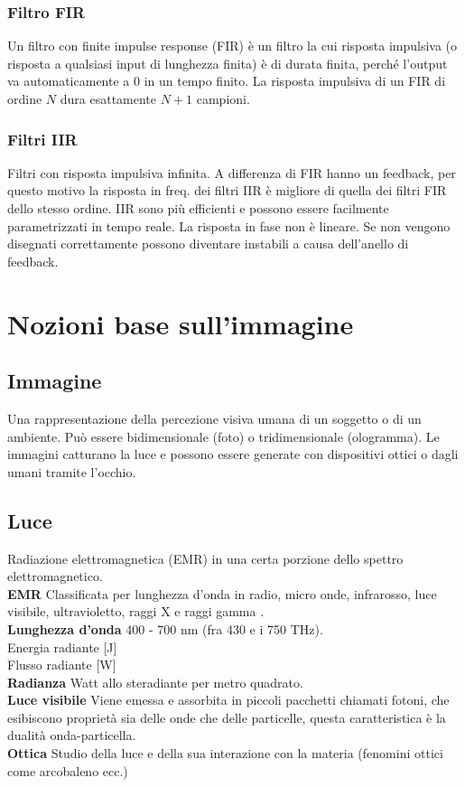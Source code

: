 \documentclass[8pt,a4paper]{article}
\begin{document}
\begin{multicols}{5}
    \subsubsection{Filtro FIR}
    Un filtro con finite impulse response (FIR) è un filtro la cui risposta
    impulsiva (o risposta a qualsiasi input di lunghezza finita) è di durata finita,
    perché l'output va automaticamente a 0 in un tempo finito.
    La risposta impulsiva di un FIR di ordine $N$ dura esattamente $N + 1$ campioni.

    \subsubsection{Filtri IIR}
    Filtri con risposta impulsiva infinita. A differenza di FIR hanno un feedback,
    per questo motivo la risposta in freq. dei filtri IIR è migliore di quella dei
    filtri FIR dello stesso ordine.
    IIR sono più efficienti e possono essere facilmente parametrizzati in tempo reale.
    La risposta in fase non è lineare. Se non vengono disegnati correttamente possono
    diventare instabili a causa dell'anello di feedback.

    \section{Nozioni base sull'immagine}
    \subsection{Immagine}
    Una rappresentazione della percezione visiva umana di un soggetto o di un ambiente.
    Può essere bidimensionale (foto) o tridimensionale (ologramma). Le immagini 
    catturano la luce e possono essere generate con dispositivi ottici o dagli umani 
    tramite l’occhio.

    \subsection{Luce}
    Radiazione elettromagnetica (EMR) in una certa porzione dello spettro 
    elettromagnetico. \\
    \textbf{EMR} Classificata per lunghezza d’onda in radio, micro onde, infrarosso, 
    luce visibile, ultravioletto, raggi X e raggi gamma . \\
    \textbf{Lunghezza d'onda} 400 - 700 nm (fra 430 e i 750 THz). \\
    Energia radiante [J]\\
    Flusso radiante [W]\\
    \textbf{Radianza} Watt allo steradiante per metro quadrato. \\
    \textbf{Luce visibile} Viene emessa e assorbita in piccoli pacchetti chiamati 
    fotoni, che esibiscono proprietà sia delle onde che delle particelle, questa 
    caratteristica è la dualità onda-particella. \\
    \textbf{Ottica} Studio della luce e della sua interazione con la materia 
    (fenomini ottici come arcobaleno ecc.) \\ 


\end{multicols}
\end{document}
